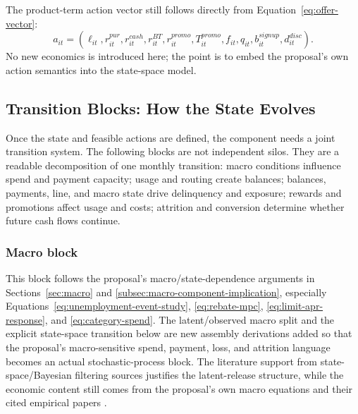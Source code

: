 \documentclass[11pt]{article}
\newcommand{\1}{\mathbf{1}}
\begin{document}
The product-term action vector still follows directly from
Equation~\eqref{eq:offer-vector}:
\begin{equation}
  a_{it}
  =
  (\ell_{it},r^{pur}_{it},r^{cash}_{it},r^{BT}_{it},r^{promo}_{it},
   T^{promo}_{it},f_{it},q_{it},b_{it}^{signup},d_{it}^{disc}).
  \label{eq:ss-action-vector}
\end{equation}
No new economics is introduced here; the point is to embed the proposal's own
action semantics into the state-space model.

\subsection{Transition Blocks: How the State Evolves}

Once the state and feasible actions are defined, the component needs a joint
transition system. The following blocks are not independent silos. They are a
readable decomposition of one monthly transition: macro conditions influence
spend and payment capacity; usage and routing create balances; balances,
payments, line, and macro state drive delinquency and exposure; rewards and
promotions affect usage and costs; attrition and conversion determine whether
future cash flows continue.

\subsubsection{Macro block}
\label{subsec:state-space-macro-block}

This block follows the proposal's macro/state-dependence arguments in
Sections~\ref{sec:macro} and \ref{subsec:macro-component-implication},
especially Equations~\eqref{eq:unemployment-event-study},
\eqref{eq:rebate-mpc}, \eqref{eq:limit-apr-response}, and
\eqref{eq:category-spend}. The latent/observed macro split and the explicit
state-space transition below are new assembly derivations added so that the
proposal's macro-sensitive spend, payment, loss, and attrition language becomes
an actual stochastic-process block. The literature support from
state-space/Bayesian filtering sources justifies the latent-release structure,
while the economic content still comes from the proposal's own macro equations
and their cited empirical papers
\citep{durbinkoopman2012ssm,westharrison1997bfdm,
ganong2019unemployment,johnson2004rebates,gross2001liquidity,baker2020epidemic}.
\end{document}
